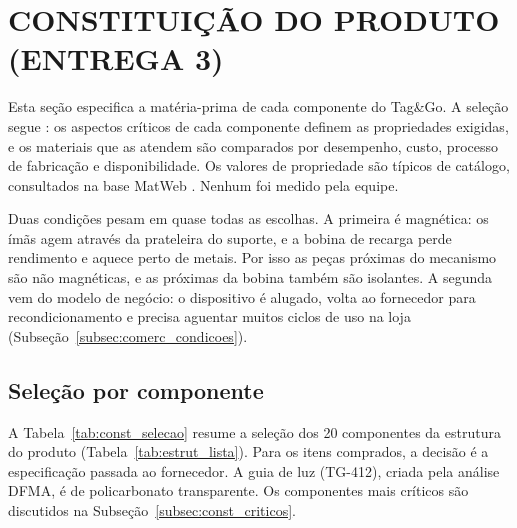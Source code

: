 \section{CONSTITUIÇÃO DO PRODUTO (ENTREGA 3)}\label{sec:constituicao_produto}

Esta seção especifica a matéria-prima de cada componente do Tag\&Go. A seleção segue : os aspectos críticos de cada componente definem as propriedades exigidas, e os materiais que as atendem são comparados por desempenho, custo, processo de fabricação e disponibilidade. Os valores de propriedade são típicos de catálogo, consultados na base MatWeb \cite{matweb}. Nenhum foi medido pela equipe.

Duas condições pesam em quase todas as escolhas. A primeira é magnética: os ímãs agem através da prateleira do suporte, e a bobina de recarga perde rendimento e aquece perto de metais. Por isso as peças próximas do mecanismo são não magnéticas, e as próximas da bobina também são isolantes. A segunda vem do modelo de negócio: o dispositivo é alugado, volta ao fornecedor para recondicionamento e precisa aguentar muitos ciclos de uso na loja (Subseção~\ref{subsec:comerc_condicoes}).

\subsection{Seleção por componente}
\label{subsec:const_selecao}

A Tabela~\ref{tab:const_selecao} resume a seleção dos 20 componentes da estrutura do produto (Tabela~\ref{tab:estrut_lista}). Para os itens comprados, a decisão é a especificação passada ao fornecedor. A guia de luz (TG-412), criada pela análise DFMA, é de policarbonato transparente. Os componentes mais críticos são discutidos na Subseção~\ref{subsec:const_criticos}.

